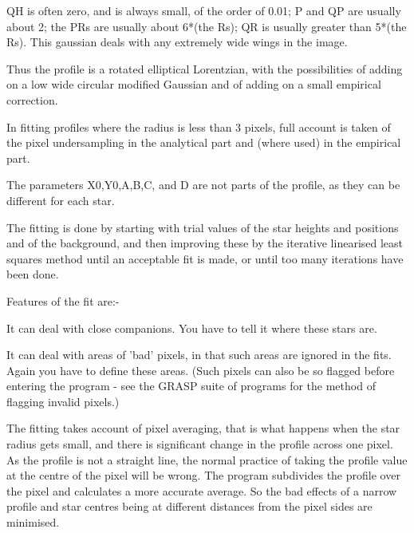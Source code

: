 {{QH is often zero, and is always small, of the order of 0.01; 
P and QP are usually about 2; the PRs are usually about 6*(the Rs);
QR is usually greater than 5*(the Rs). This gaussian deals with 
any extremely wide wings in the image.


Thus the profile is a rotated elliptical Lorentzian, with the possibilities
of adding on a low wide circular modified Gaussian and of adding on a
small empirical correction.

In fitting profiles where the radius is less than 3 pixels, full account
is taken of the pixel undersampling in the analytical part and (where used) 
in the empirical part.
                                                                               
 The parameters X0,Y0,A,B,C, and D are not parts of the profile, as
 they can be different for each star.
                                                                               
 The fitting is done by starting with trial values of the star heights
 and positions and of the background, and then improving these by the
 iterative linearised least squares method until an acceptable fit is
 made, or until too many iterations have been done.
                                                                               
 Features of the fit are:-

 \begin{list}{{-}}{}
 \item It can deal with close companions. You have to tell it where
     these stars are.
  \item It can deal with areas of 'bad' pixels, in that such areas are
     ignored in the fits. Again you have to define these areas. (Such
     pixels can also be so flagged before entering the program - see
     the GRASP suite of programs for the method of flagging invalid
     pixels.)
\end{list}
                                                                               
 The fitting takes account of pixel averaging, that is what happens
 when the star radius gets small, and there is significant change in
 the profile across one pixel. As the profile is not a straight line,
 the normal practice of taking the profile value at the centre of the
 pixel will be wrong. The program subdivides the profile over the
 pixel and calculates a more accurate average. So the bad effects of
 a narrow profile and star centres being at different distances from
 the pixel sides are minimised.
                                                                               
}}
